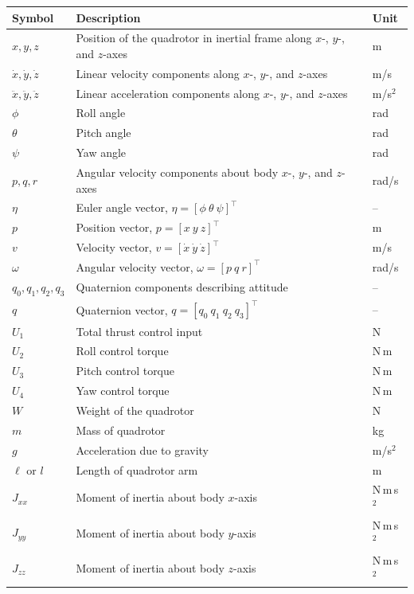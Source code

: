 \documentclass[12pt,a4paper]{report}
\begin{document}
\begin{longtable}{p{3cm} p{9cm} p{2.5cm}}
\textbf{Symbol} & \textbf{Description} & \textbf{Unit} \\
\hline
$x, y, z$ & Position of the quadrotor in inertial frame along $x$-, $y$-, and $z$-axes & m \\
$\dot{x}, \dot{y}, \dot{z}$ & Linear velocity components along $x$-, $y$-, and $z$-axes & m/s \\
$\ddot{x}, \ddot{y}, \ddot{z}$ & Linear acceleration components along $x$-, $y$-, and $z$-axes & m/s$^2$ \\

$\phi$ & Roll angle & rad \\
$\theta$ & Pitch angle & rad \\
$\psi$ & Yaw angle & rad \\

$p, q, r$ & Angular velocity components about body $x$-, $y$-, and $z$-axes & rad/s \\

$\eta$ & Euler angle vector, $\eta = [\phi \ \theta \ \psi]^{\top}$ & -- \\
$p$ & Position vector, $p = [x \ y \ z]^{\top}$ & m \\
$v$ & Velocity vector, $v = [\dot{x} \ \dot{y} \ \dot{z}]^{\top}$ & m/s \\
$\omega$ & Angular velocity vector, $\omega = [p \ q \ r]^{\top}$ & rad/s \\

$q_0, q_1, q_2, q_3$ & Quaternion components describing attitude & -- \\
$q$ & Quaternion vector, $q = [q_0 \ q_1 \ q_2 \ q_3]^{\top}$ & -- \\

$U_1$ & Total thrust control input & N \\
$U_2$ & Roll control torque & N\,m \\
$U_3$ & Pitch control torque & N\,m \\
$U_4$ & Yaw control torque & N\,m \\

$W$ & Weight of the quadrotor & N \\
$m$ & Mass of quadrotor & kg \\
$g$ & Acceleration due to gravity & m/s$^2$ \\
$\ell$ or $l$ & Length of quadrotor arm & m \\

$J_{xx}$ & Moment of inertia about body $x$-axis & N\,m\,s$^2$ \\
$J_{yy}$ & Moment of inertia about body $y$-axis & N\,m\,s$^2$ \\
$J_{zz}$ & Moment of inertia about body $z$-axis & N\,m\,s$^2$ \\


\end{longtable}
\end{document}
